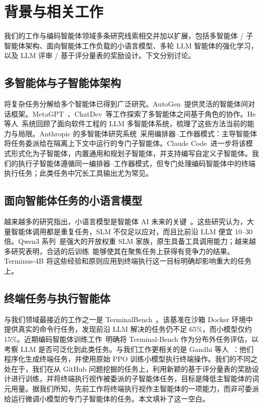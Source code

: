 \documentclass[sigconf,review]{acmart}
\begin{document}
\section{背景与相关工作}
我们的工作与编码智能体领域多条研究线索相交并加以扩展，包括多智能体 / 子智能体架构、面向智能体工作负载的小语言模型、多轮 LLM 智能体的强化学习，以及 LLM 评审 / 基于评分量表的奖励设计。下文分别讨论。

\subsection{多智能体与子智能体架构}
将复杂任务分解给多个智能体已得到广泛研究。AutoGen~\cite{autogen}提供灵活的智能体间对话框架。MetaGPT~\cite{metagpt}、ChatDev~\cite{chatdev}等工作探索了多智能体之间基于角色的协作。He 等人~\cite{hesurvey}系统回顾了面向软件工程的 LLM 多智能体系统，梳理了这些方法当前的能力与局限。Anthropic 的多智能体研究系统~\cite{anthropicmultiagent}采用编排器--工作器模式：主导智能体将任务委派给在隔离上下文中运行的专门子智能体。Claude Code~\cite{claude_code_2024}进一步将该模式形式化为子智能体，内置通用和规划子智能体，并支持编写自定义子智能体。我们的执行子智能体遵循同一编排器--工作器模式，但专门处理编码智能体中的终端执行任务；此类任务中冗长工具输出尤为常见。

\subsection{面向智能体任务的小语言模型}
越来越多的研究指出，小语言模型是智能体 AI 未来的关键~\cite{slmfuture}。这些研究认为，大量智能体调用都是重复任务，SLM 不仅足以应对，而且比前沿 LLM 便宜 10--30 倍。Qwen3 系列~\cite{qwen}是强大的开放权重 SLM 家族，原生具备工具调用能力；越来越多研究表明，合适的后训练~\cite{deepseekr1, dangreason}能够使其在聚焦任务上获得有竞争力的结果。Terminus-4B 将这些经验和原则应用到终端执行这一目标明确却影响重大的任务上。

\subsection{终端任务与执行智能体}
与我们领域最接近的工作之一是 TerminalBench~\cite{terminalbench}。该基准在沙箱 Docker 环境中提供真实的命令行任务，发现前沿 LLM 解决的任务仍不足 65\%，而小模型仅约 15\%。近期编码智能体训练工作~\cite{qwencodernext, skyrlagent}明确将 Terminal-Bench 作为分布外任务评估，以考察 LLM 是否可泛化到此类任务。与我们工作更相关的是 Gandhi 等人~\cite{endlessterminals}：他们程序化生成终端任务，并使用原始 PPO 训练小模型执行终端操作。我们的不同之处在于，我们在从 GitHub 问题挖掘的任务上，利用新颖的基于评分量表的奖励设计进行训练，并将终端执行视作被委派的子智能体任务，目标是降低主智能体的词元用量。据我们所知，先前工作将终端执行视作主智能体的一项能力，而非可委派给运行微调小模型的专门子智能体的任务。本文填补了这一空白。
\end{document}
